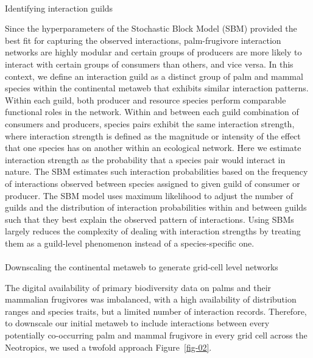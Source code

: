 \documentclass[
]{agujournal2019}
\makeatletter
\let\oldparagraph\paragraph
\renewcommand{\paragraph}{
    \@ifstar
      \xxxParagraphStar
      \xxxParagraphNoStar
  }
\newcommand{\xxxParagraphStar}[1]{\oldparagraph*{#1}\mbox{}}
\newcommand{\xxxParagraphNoStar}[1]{\oldparagraph{#1}\mbox{}}
\makeatother
\begin{document}
\paragraph{Identifying interaction
guilds}\label{identifying-interaction-guilds}

Since the hyperparameters of the Stochastic Block Model (SBM) provided
the best fit for capturing the observed interactions, palm-frugivore
interaction networks are highly modular and certain groups of producers
are more likely to interact with certain groups of consumers than
others, and vice versa. In this context, we define an interaction guild
as a distinct group of palm and mammal species within the continental
metaweb that exhibits similar interaction patterns. Within each guild,
both producer and resource species perform comparable functional roles
in the network. Within and between each guild combination of consumers
and producers, species pairs exhibit the same interaction strength,
where interaction strength is defined as the magnitude or intensity of
the effect that one species has on another within an ecological network.
Here we estimate interaction strength as the probability that a species
pair would interact in nature. The SBM estimates such interaction
probabilities based on the frequency of interactions observed between
species assigned to given guild of consumer or producer. The SBM model
uses maximum likelihood to adjust the number of guilds and the
distribution of interaction probabilities within and between guilds such
that they best explain the observed pattern of interactions. Using SBMs
largely reduces the complexity of dealing with interaction strengths by
treating them as a guild-level phenomenon instead of a species-specific
one.

\paragraph{Downscaling the continental metaweb to generate grid-cell
level
networks}\label{downscaling-the-continental-metaweb-to-generate-grid-cell-level-networks}

The digital availability of primary biodiversity data on palms and their
mammalian frugivores was imbalanced, with a high availability of
distribution ranges and species traits, but a limited number of
interaction records. Therefore, to downscale our initial metaweb to
include interactions between every potentially co-occurring palm and
mammal frugivore in every grid cell across the Neotropics, we used a
twofold approach Figure~\ref{fig-02}.
\end{document}
